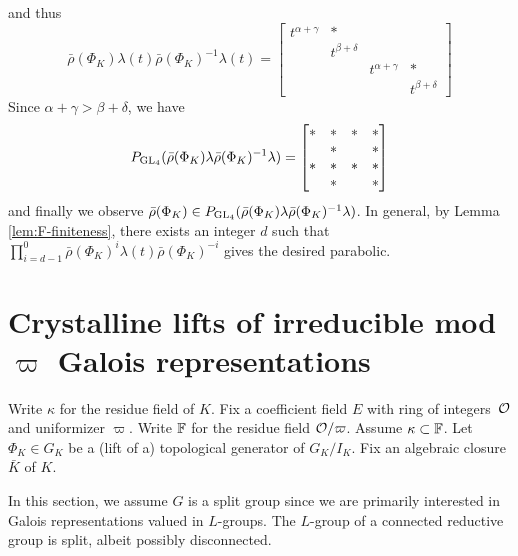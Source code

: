 \documentclass[10pt,a4paper,twoside]{article}
\begin{document}
and thus
$$
\bar\rho(\Phi_K)\lambda(t)\bar\rho(\Phi_K)^{-1}\lambda(t) = \begin{bmatrix}
t^{\alpha+\gamma} & * & & \\
& t^{\beta+\delta} & & \\
& & t^{\alpha+\gamma} & * \\
& & & t^{\beta+\delta}
\end{bmatrix}
$$
Since $\alpha+\gamma>\beta+\delta$, we have
$$
P_{\operatorname{GL}_4}(\bar\rho(\Phi_K)\lambda\bar\rho(\Phi_K)^{-1}\lambda) = 
\begin{bmatrix}
* & * & * & *\\
& * & & * \\
* & * & * & * \\
& * && *
\end{bmatrix}
$$
and finally we observe $\bar\rho(\Phi_K) \in P_{\operatorname{GL}_4}(\bar\rho(\Phi_K)\lambda\bar\rho(\Phi_K)^{-1}\lambda)$.
In general, by Lemma \ref{lem:F-finiteness}, there exists an integer $d$ such that
$\prod_{i=d-1}^0 \bar\rho(\Phi_K)^i\lambda(t)\bar\rho(\Phi_K)^{-i}$ gives the desired parabolic.


 
\section{Crystalline lifts of irreducible mod $\varpi$ Galois representations}


\label{subsec:crys-ch}

Write $\kappa$ for the residue field of $K$.
Fix a coefficient field $E$ with ring of integers~$\mathcal{O}$ and uniformizer $\varpi$.
Write ${\mathbb{F}}$ for the residue field $\mathcal{O}/\varpi$.
Assume $\kappa\subset {\mathbb{F}}$.
Let $\Phi_K \in G_K$ be a (lift of a) topological generator of $G_K/I_K$.
Fix an algebraic closure $\bar K$ of $K$.

In this section, we assume $G$ is a split group since we are primarily interested in Galois representations valued in $L$-groups.
The $L$-group of a connected reductive group is split, albeit possibly disconnected.
\end{document}
